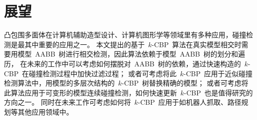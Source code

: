 \section{展望}
\label{sec:futurework}

凸包围多面体在计算机辅助造型设计、计算机图形学等领域里有多种应用，碰撞检测是最其中重要的应用之一。
本文提出的基于~$k$-CBP~算法在真实模型相交时需要用模型~AABB~树进行相交检测，因此算法依赖于模型~AABB~树的划分和遍历，
在未来的工作中可以考虑如何摆脱对~AABB~树的依赖，通过快速构造的~$k$-CBP~在碰撞检测过程中加快过滤过程；
或者可考虑将此~$k$-CBP~应用于近似碰撞检测算法中，用模型的多层次结构的~$k$-CBP~树替换精确的模型；
或者可考虑将此算法应用于可变形的模型连续碰撞检测，如何快速更新~$k$-CBP~也是值得研究的方向之一。
同时在未来工作可考虑如何将~$k$-CBP~应用于如机器人抓取、路径规划等其他应用领域中。
